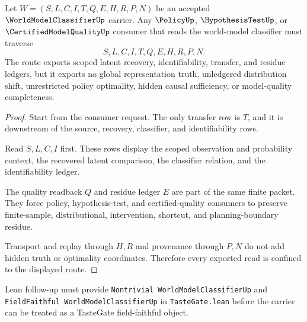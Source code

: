 \begin{theorem}
\label{thm:world-model-classifier-transfer-residue-boundary}
Let $W=(S,L,C,I,T,Q,E,H,R,P,N)$ be an accepted $\WorldModelClassifierUp$ carrier. Any $\PolicyUp$, $\HypothesisTestUp$, or $\CertifiedModelQualityUp$ consumer that reads the world-model classifier must traverse
$$
S,L,C,I,T,Q,E,H,R,P,N .
$$
The route exports scoped latent recovery, identifiability, transfer, and residue ledgers, but it exports no global representation truth, unledgered distribution shift, unrestricted policy optimality, hidden causal sufficiency, or model-quality completeness.
\end{theorem}
\begin{proof}
Start from the consumer request. The only transfer row is $T$, and it is downstream of the source, recovery, classifier, and identifiability rows.

Read $S,L,C,I$ first. These rows display the scoped observation and probability context, the recovered latent comparison, the classifier relation, and the identifiability ledger.

The quality readback $Q$ and residue ledger $E$ are part of the same finite packet. They force policy, hypothesis-test, and certified-quality consumers to preserve finite-sample, distributional, intervention, shortcut, and planning-boundary residue.

Transport and replay through $H,R$ and provenance through $P,N$ do not add hidden truth or optimality coordinates. Therefore every exported read is confined to the displayed route.
\end{proof}



Lean follow-up must provide \texttt{Nontrivial WorldModelClassifierUp} and \texttt{FieldFaithful WorldModelClassifierUp} in \texttt{TasteGate.lean} before the carrier can be treated as a TasteGate field-faithful object.

